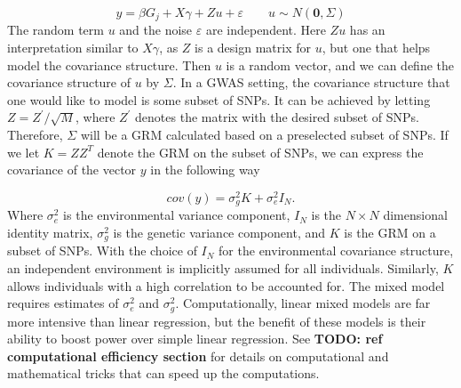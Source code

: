\begin{equation}\label{eq:baseMixedModelGWAS}
y = \beta G_{j} +  X\gamma + Zu + \varepsilon \qquad u \sim N(\mathbf{0}, \Sigma)
\end{equation}
The random term $ u $ and the noise $ \varepsilon $ are independent. Here $ Zu $ has an interpretation similar to $ X\gamma $, as $ 
Z $ is a design matrix for $ u $, but one that helps model the covariance structure. Then $ u $ is a random 
vector, and we can define the covariance structure of $ u $ by $ \Sigma $. In a GWAS setting, the covariance structure that one would 
like to model is some subset of SNPs. It can be achieved by letting $ Z = Z^{'}/\sqrt{M} $, where $ Z^{'} $ denotes the matrix 
with the desired subset of SNPs. Therefore, $ \Sigma $ will be a GRM calculated based on a preselected subset of SNPs. If 
we let $ K = ZZ^{T} $ denote the GRM on the subset of SNPs, we can express the covariance of the vector $ y $ in the following way

\begin{equation} \label{eq:MixedModelGWASCovariance}
cov(y) = \sigma_g^2K + \sigma^2_e I_N.
\end{equation}
Where $ \sigma^2_e $ is the environmental variance component, $ I_N $ is the $ N \times N $ dimensional identity matrix, $ \sigma_g^2 
$ is the genetic variance component, and $ K $ is the GRM on a subset of SNPs. With the choice of $ I_N $ for the environmental 
covariance structure, an independent environment is implicitly assumed for all individuals. Similarly, $ K $ allows individuals with a 
high correlation to be accounted for. The mixed model requires estimates of $ \sigma_e^2 $ and $ \sigma_g^2 $. Computationally, linear 
mixed models are far more intensive than linear regression, but the benefit of these models is their ability to boost power over 
simple linear regression. See \textbf{TODO: ref computational efficiency section} for details on computational and mathematical tricks 
that can speed up the computations.


